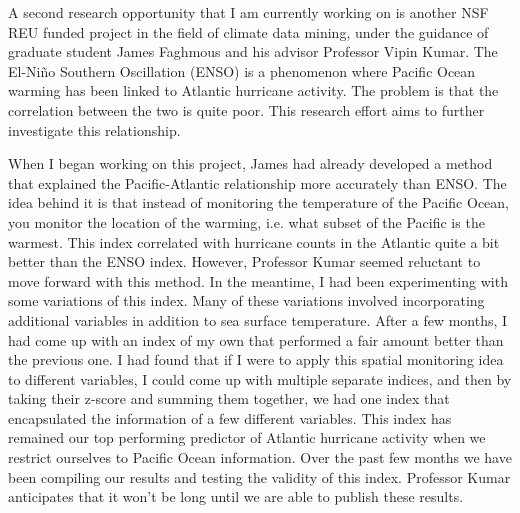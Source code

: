 \documentclass[a4paper,12pt]{article}
\begin{document}
A second research opportunity that I am currently working on is another NSF REU funded project in the field of climate data mining, under the guidance of graduate student James Faghmous and his advisor Professor Vipin Kumar.  The El-Ni\~{n}o Southern Oscillation (ENSO) is a phenomenon where Pacific Ocean warming has been linked to Atlantic hurricane activity\cite{enso}.  The problem is that the correlation between the two is quite poor.  This research effort aims to further investigate this relationship. 

When I began working on this project, James had already developed a method that explained the Pacific-Atlantic relationship more accurately than ENSO.  The idea behind it is that instead of monitoring the temperature of the Pacific Ocean, you monitor the location of the warming, i.e. what subset of the Pacific is the warmest.  This index correlated with hurricane counts in the Atlantic quite a bit better than the ENSO index.  However, Professor Kumar seemed reluctant to move forward with this method.  In the meantime, I had been experimenting with some variations of this index.  Many of these variations involved incorporating additional variables in addition to sea surface temperature.  After a few months, I had come up with an index of my own that performed a fair amount better than the previous one.  I had found that if I were to apply this spatial monitoring idea to different variables, I could come up with multiple separate indices, and then by taking their z-score and summing them together, we had one index that encapsulated the information of a few different variables.  This index has remained our top performing predictor of Atlantic hurricane activity when we restrict ourselves to Pacific Ocean information.  Over the past few months we have been compiling our results and testing the validity of this index.  Professor Kumar anticipates that it won't be long until we are able to publish these results.
\end{document}

